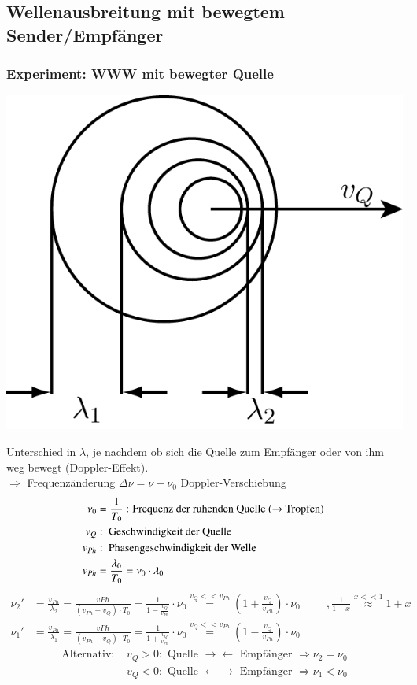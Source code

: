 \subsection{Wellenausbreitung mit bewegtem Sender/Empfänger} \enter
\subsubsection{Experiment: WWW mit bewegter Quelle}
\begin{center}
	\includegraphics[width=0.5\linewidth]{skizzen/19/19B29}
\end{center}
Unterschied in $ \lambda $, je nachdem ob sich die Quelle zum Empfänger oder von ihm weg bewegt (Doppler-Effekt).\\
$ \Rightarrow $ Frequenzänderung $ \Delta\nu = \nu-\nu_0 $ Doppler-Verschiebung \\
\begin{align*}
\nu_0 &= \frac{1}{T_0} \text{ : Frequenz der ruhenden Quelle ($ \rightarrow $ Tropfen) }\\
v_Q &: \text{ Geschwindigkeit der Quelle }\\
v_{Ph} &: \text{ Phasengeschwindigkeit der Welle }\\
v_{Ph} &= \frac{\lambda_0}{T_0} = \nu_0 \cdot \lambda_0
\end{align*}
\begin{align*}
\nu_2'&=\frac{v_{Ph}}{\lambda_2} = \frac{v{Ph}}{(v_{Ph}-v_Q)\cdot T_0} = \frac{1}{1-\frac{v_Q}{v_{Ph}}} \cdot \nu_0 \overset{v_Q<<v_{Ph}}{=} (1+\frac{v_Q}{v_{Ph}}) \cdot \nu_0 \hspace{1cm}, \frac{1}{1-x} \overset{x<<1}{\approx} 1+x \\
\nu_1'&=\frac{v_{Ph}}{\lambda_1} = \frac{v{Ph}}{(v_{Ph}+v_Q)\cdot T_0} = \frac{1}{1+\frac{v_Q}{v_{Ph}}} \cdot \nu_0 \overset{v_Q<<v_{Ph}}{=} (1-\frac{v_Q}{v_{Ph}}) \cdot \nu_0
\end{align*}
\begin{align*}
\text{Alternativ: } &v_Q > 0 : \text{ Quelle } \rightarrow \leftarrow \text{ Empfänger } \Rightarrow \nu_2 = \nu_0\\
&v_Q<0: \text{ Quelle } \leftarrow \rightarrow \text{ Empfänger } \Rightarrow \nu_1<\nu_0
\end{align*}
